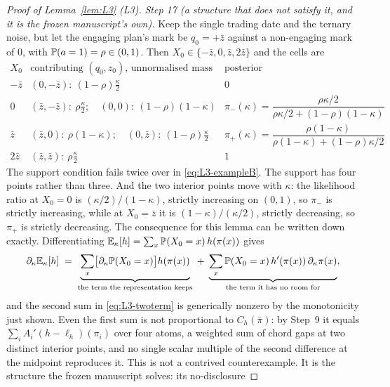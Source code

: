 \begin{proof}[Proof of Lemma~\ref{lem:L3} (L3)]
\emph{Step 17 (a structure that does not satisfy it, and it is the frozen manuscript's own).} Keep
the single trading date and the ternary noise, but let the engaging plan's mark be $q_0 = +\bar z$
against a non-engaging mark of $0$, with $\mathbb{P}(a=1) = \rho \in (0,1)$. Then
$X_0 \in \{-\bar z,0,\bar z,2\bar z\}$ and the cells are
\begin{equation}
\label{eq:L3-exampleB}
\begin{array}{c|l|c}
X_0 & \text{contributing } (q_0,z_0)\text{, unnormalised mass} & \text{posterior}\\
\hline
-\bar z & (0,-\bar z):\ (1-\rho)\tfrac{\kappa}{2}
  & 0\\
0 & (\bar z,-\bar z):\ \rho\tfrac{\kappa}{2};\quad (0,0):\ (1-\rho)(1-\kappa)
  & \pi_-(\kappa) = \dfrac{\rho\kappa/2}{\rho\kappa/2+(1-\rho)(1-\kappa)}\\
\bar z & (\bar z,0):\ \rho(1-\kappa);\quad (0,\bar z):\ (1-\rho)\tfrac{\kappa}{2}
  & \pi_+(\kappa) = \dfrac{\rho(1-\kappa)}{\rho(1-\kappa)+(1-\rho)\kappa/2}\\
2\bar z & (\bar z,\bar z):\ \rho\tfrac{\kappa}{2}
  & 1
\end{array}
\end{equation}
The support condition fails twice over in \eqref{eq:L3-exampleB}. The support has four points rather
than three. And the two interior points move with $\kappa$: the likelihood ratio at $X_0 = 0$ is
$(\kappa/2)/(1-\kappa)$, strictly increasing on $(0,1)$, so $\pi_-$ is strictly increasing, while at
$X_0 = \bar z$ it is $(1-\kappa)/(\kappa/2)$, strictly decreasing, so $\pi_+$ is strictly decreasing.
The consequence for this lemma can be written down exactly. Differentiating
$\mathbb{E}_\kappa[h] = \sum_x \mathbb{P}(X_0=x)\,h(\pi(x))$ gives
\begin{equation}
\label{eq:L3-twoterm}
\partial_\kappa \mathbb{E}_\kappa[h]
 \;=\; \underbrace{\sum_x \bigl[\partial_\kappa\mathbb{P}(X_0=x)\bigr]h(\pi(x))}_{\text{the term the
   representation keeps}}
 \;+\; \underbrace{\sum_x \mathbb{P}(X_0=x)\,h'(\pi(x))\,\partial_\kappa\pi(x)}_{\text{the term it has no
   room for}},
\end{equation}
and the second sum in \eqref{eq:L3-twoterm} is generically nonzero by the monotonicity just shown.
Even the first sum is not proportional to $C_h(\bar\pi)$: by Step~9 it equals
$\sum_i A_i'(h-\ell_h)(\pi_i)$ over four atoms, a weighted sum of chord gaps at two distinct interior
points, and no single scalar multiple of the second difference at the midpoint reproduces it. This is
not a contrived counterexample. It is the structure the frozen manuscript solves: its no-disclosure

\end{proof}
